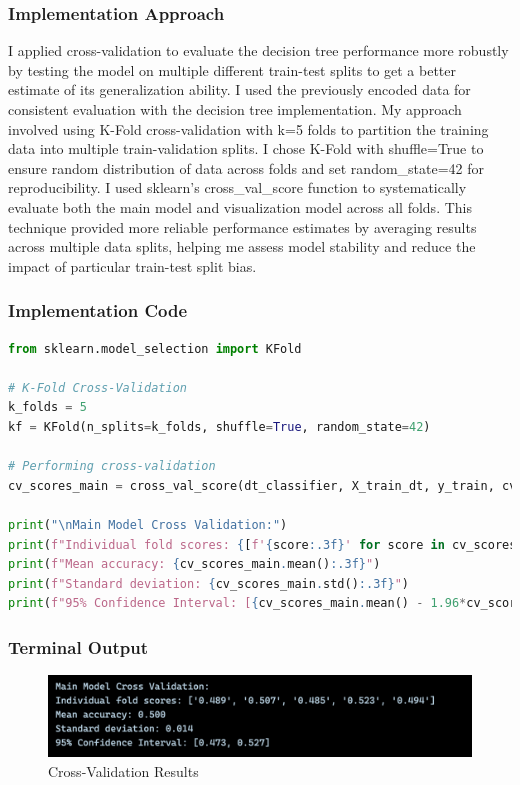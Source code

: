 \documentclass[12pt,a4paper]{article}
\begin{document}
\subsubsection{Implementation Approach}
I applied cross-validation to evaluate the decision tree performance more robustly by testing the model on multiple different train-test splits to get a better estimate of its generalization ability. I used the previously encoded data for consistent evaluation with the decision tree implementation. My approach involved using K-Fold cross-validation with k=5 folds to partition the training data into multiple train-validation splits. I chose K-Fold with shuffle=True to ensure random distribution of data across folds and set random\_state=42 for reproducibility. I used sklearn's cross\_val\_score function to systematically evaluate both the main model and visualization model across all folds. This technique provided more reliable performance estimates by averaging results across multiple data splits, helping me assess model stability and reduce the impact of particular train-test split bias.

\subsubsection{Implementation Code}
\begin{lstlisting}[language=Python, caption= Cross-Validation]
from sklearn.model_selection import KFold

# K-Fold Cross-Validation
k_folds = 5
kf = KFold(n_splits=k_folds, shuffle=True, random_state=42)

# Performing cross-validation 
cv_scores_main = cross_val_score(dt_classifier, X_train_dt, y_train, cv=kf, scoring='accuracy')

print("\nMain Model Cross Validation:")
print(f"Individual fold scores: {[f'{score:.3f}' for score in cv_scores_main]}")
print(f"Mean accuracy: {cv_scores_main.mean():.3f}")
print(f"Standard deviation: {cv_scores_main.std():.3f}")
print(f"95% Confidence Interval: [{cv_scores_main.mean() - 1.96*cv_scores_main.std():.3f}, {cv_scores_main.mean() + 1.96*cv_scores_main.std():.3f}]")

\end{lstlisting}

\subsubsection{Terminal Output}

\begin{figure}[h!]
\centering
\includegraphics[width=\textwidth]{Figures/cross.png}
\caption{Cross-Validation Results}
\end{figure}
\end{document}
